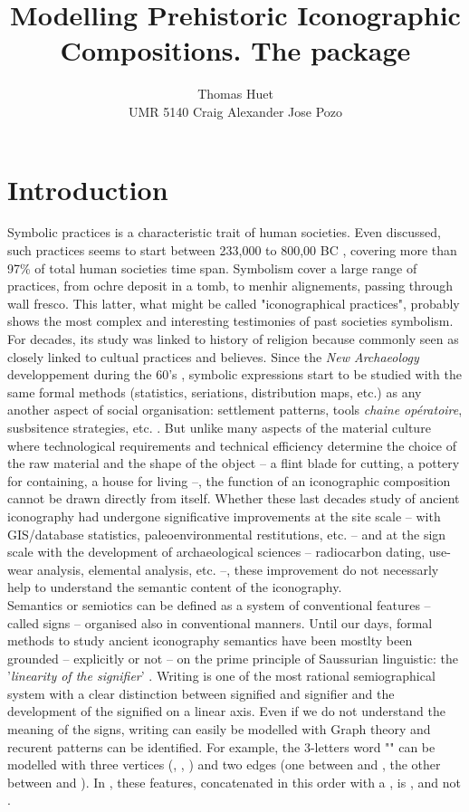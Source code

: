 \documentclass[article]{jss}\usepackage{knitr}
\author{Thomas Huet\\UMR 5140 \And Craig Alexander \And Jose Pozo}
\title{Modelling Prehistoric Iconographic Compositions. The \proglang{R} package \pkg{decorr}}
\begin{document}

\section[Introduction]{Introduction} \label{sec:intro}

Symbolic practices is a characteristic trait of human societies. Even discussed, such practices seems to start between 233,000 to 800,00 BC \citep{dErrico00}, covering more than 97\% of total human societies time span. Symbolism cover a large range of practices, from ochre deposit in a tomb, to menhir alignements, passing through wall fresco. This latter, what might be called "iconographical practices", probably shows the most complex and interesting testimonies of past societies symbolism. For decades, its study was linked to history of religion because commonly seen as closely linked to cultual practices and believes. Since the \textit{New Archaeology} developpement during the 60's \citep{Clarke14}, symbolic expressions start to be studied with the same formal methods (statistics, seriations, distribution maps, etc.) as any another aspect of social organisation: settlement patterns, tools \emph{chaine op\'eratoire}, susbsitence strategies, etc. \citep{Renfrew91}. But unlike many aspects of the material culture where technological requirements and technical efficiency determine the choice of the raw material and the shape of the object -- a flint blade for cutting, a pottery for containing, a house for living --, the function of an iconographic composition cannot be drawn directly from itself. Whether these last decades study of ancient iconography had  undergone significative improvements at the site scale -- with GIS/database statistics, paleoenvironmental restitutions, etc. -- and at the sign scale with the development of archaeological sciences -- radiocarbon dating, use-wear analysis, elemental analysis, etc. --, these improvement do not necessarly help to understand the semantic content of the iconography.\\
Semantics or semiotics can be defined as a system of conventional features -- called signs -- organised also in conventional manners. Until our days, formal methods to study ancient iconography semantics have been mostlty been grounded  -- explicitly or not -- on the prime principle of Saussurian linguistic: the '\emph{linearity of the signifier}' \citep{Saussure89}.  
Writing is one of the most rational semiographical system with a clear distinction between signified and signifier and the development of the signified on a linear axis. Even if we do not understand the meaning of the signs, writing can easily be modelled with Graph theory and recurent patterns can be identified. For example, the 3-letters word "" can be modelled with three vertices (, , ) and two edges (one between  and , the other between  and ). In , these features, concatenated in this order with a , is , and not .
\end{document}
